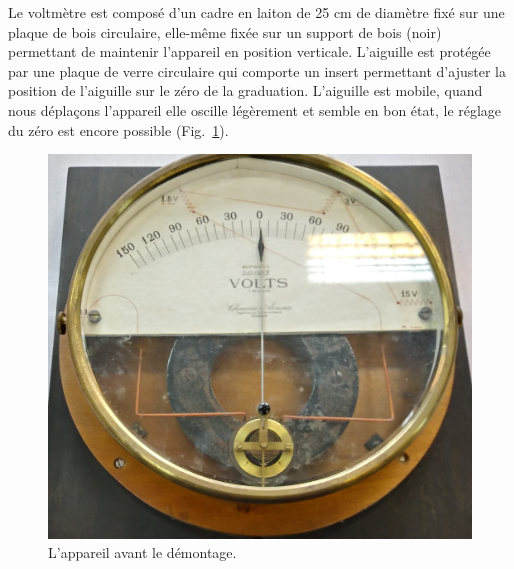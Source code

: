 \documentclass[12pt,a4paper,fleqn]{article}
\begin{document}
Le voltmètre est composé d'un cadre en laiton de 25 cm de diamètre fixé sur une plaque de bois circulaire, elle-même fixée sur un support de bois (noir) permettant de maintenir l'appareil en position verticale.
L'aiguille est protégée par une plaque de verre circulaire qui comporte un insert permettant d'ajuster la position de l'aiguille sur le zéro de la graduation.
L'aiguille est mobile, quand nous déplaçons l'appareil elle oscille légèrement et semble en bon état, le réglage du zéro est encore possible (Fig.~\ref{fig:galva_volt_av}).
\begin{figure}[htbp]
    \center
    \includegraphics[height=300 pt]{images/20210205_150347_HDR.jpg}
    \caption{L'appareil avant le démontage.}
    \label{fig:galva_volt_av}
\end{figure}
\end{document}
